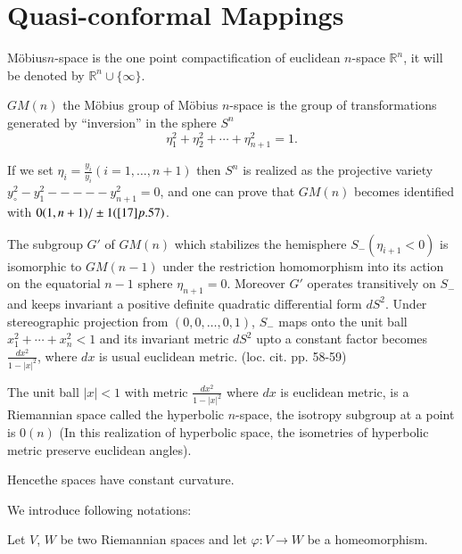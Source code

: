 
\chapter{Quasi-conformal Mappings}\label{chap10}

\begin{defi*}
  M\"obius\pageoriginale $n$-space is the one point compactification of eucli\-dean
  $n$-space $\mathbb{R}^n$, it will be denoted by $\mathbb{R}^n \cup
  \{ \infty\}$.
\end{defi*}

$GM(n)$ the M\"obius group of M\"obius $n$-space is the group of
transformations generated by ``inversion'' in the sphere $S^n$
$$
\eta_1^2 + \eta_2^2 + \cdots + \eta_{n+1}^2=1.
$$

If we set $\eta_i = \frac{y_i}{y_i}(i=1, \ldots , n+1)$ then $S^n$ is
realized as the projective variety $y^2_\circ- y^2_1-----y^2_{n+1}=0$,
and one can prove that $GM(n)$ becomes identified with $0(1, n+1)/\pm
1 (\cite{17}p. 57)$.

\begin{thm} \label{chap10:thm10.1}
  The subgroup $G'$ of $GM(n)$ which stabilizes the hemisphere
  $S_-(\eta_{i+1}< 0)$ is isomorphic to $GM(n-1)$ under the
  restriction homomorphism into its action on the equatorial $n-1$
  sphere $\eta_{n+1}=0$. Moreover $G'$ operates transitively on $S_-$
  and keeps invariant a positive definite quadratic differential form
  $dS^2$. Under stereographic projection from $(0, 0, \ldots, 0, 1)$,
  $S_-$ maps onto the unit ball $x_1^2 + \cdots + x^2_n < 1$ and its
  invariant metric $dS^2$ upto a constant factor becomes
  $\frac{dx^2}{1-|x|^2}$, where $dx$ is usual euclidean metric. \hfill
  (loc. cit. pp. 58-59) 
\end{thm}

The unit ball $|x|<1$ with metric $\frac{dx^2}{1- |x|^2}$ where $dx$
is euclidean metric, is a Riemannian space called the hyperbolic
$n$-space, the isotropy subgroup at a point is $0(n)$ (In this
realization of hyperbolic space, the isometries of hyperbolic metric
preserve euclidean angles).

Hence\pageoriginale the spaces have constant curvature.

We introduce following notations:

Let $V$, $W$ be two Riemannian spaces and let $\varphi: V \to W$ be a
homeomorphism. 

